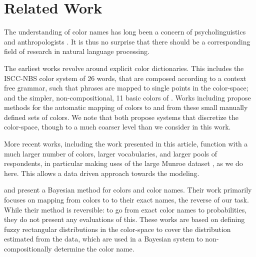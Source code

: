 \documentclass[]{clv3}
\newcommand{\parencite}{\citep}
\newcommand{\textcite}{\citet}
\begin{document}
\section{Related Work}\label{sec:related-work}
The understanding of color names has long been a concern of psycholinguistics and anthropologists \parencite{berlin1969basic,heider1972universals,HEIDER1972337,mylonas2015use}.
It is thus no surprise that there should be a corresponding field of research in natural language processing.

The earliest works revolve around explicit color dictionaries.
This includes the ISCC-NBS color system \parencite{kelly1955iscc} of 26 words, that are composed according to a context free grammar, such that phrases are mapped to single points in the color-space;
and the simpler, non-compositional, 11 basic colors of \textcite{berlin1969basic}.
Works including \textcite{Berk:1982:HFS:358589.358606,conway1992experimental,ele1994computational, mojsilovic2005computational, menegaz2007discrete,van2009learning}  propose methods for the automatic mapping of colors to and from these small manually defined sets of colors.
We note that \textcite{menegaz2007discrete,van2009learning} both propose systems that discretize the color-space, though to a much coarser level than we consider in this work.


More recent works, including the work presented in this article, function with a much larger number of colors, larger vocabularies, and larger pools of respondents, 
in particular making uses of the large Munroe dataset \parencite{Munroe2010XKCDdataset}, as we do here.
This allows a data driven approach towards the modeling.


\textcite{mcmahan2015bayesian} and \textcite{meomcmahanstone:color} present a Bayesian method for  colors and color names.
Their work primarily focuses on mapping from colors to to their exact names, the reverse of our task.
While their method is reversible: to go from exact color names to probabilities, they do not present any evaluations of this.
These works are based on defining fuzzy rectangular distributions in the color-space to cover the distribution estimated from the data, which are used in a Bayesian system to non-compositionally determine the color name.
\end{document}
